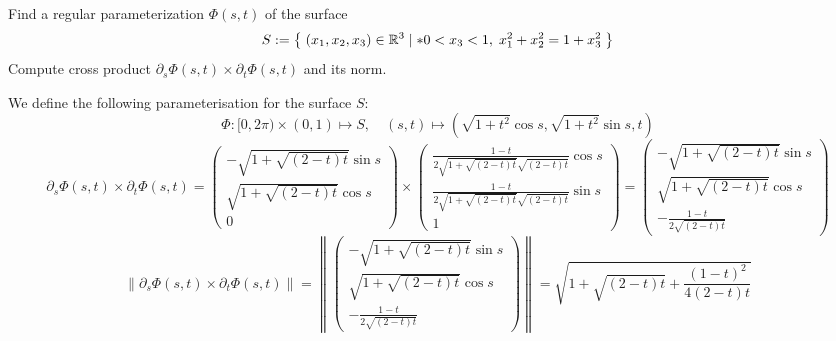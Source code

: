 \documentclass[11pt]{article}
\begin{document}
\begin{exercise}
    Find a regular parameterization $\Phi(s,t)$ of the surface 
    \begin{gather*}
        S := \left\{\; (x_1,x_2,x_3) \in \mathbb R^3 \suchthat* 0 < x_3 < 1, \; x_1^2 + x_2^2 = 1 + x_3^2 \;\right\}
    \end{gather*}
    Compute cross product $\partial_s \Phi(s,t) \times \partial_t \Phi(s,t)$ and its norm. 
\end{exercise}
\begin{solution}     
    We define the following parameterisation for the surface $S$:
    \[
        \Phi: [0,2\pi) \times (0,1) \mapsto S,
        \quad 
        (s,t) \mapsto \left( \sqrt{1+t^{2}}\cos s, \sqrt{1+t^{2}}\sin s, t \right)
    \]
    \[
        \partial_s \Phi(s,t) \times \partial_t \Phi(s,t) 
        = 
        \begin{pmatrix} 
            -\sqrt{1+\sqrt{(2 - t)t}}\sin s
            \\ 
            \sqrt{1+\sqrt{(2 - t)t}}\cos s
            \\
            0 
        \end{pmatrix} 
        \times 
        \begin{pmatrix} 
            \frac{1 - t}{2\sqrt{1+\sqrt{(2-t)t}}\sqrt{(2-t)t}}\cos s 
            \\ 
            \frac{1 - t}{2\sqrt{1+\sqrt{(2-t)t}}\sqrt{(2-t)t}}\sin s 
            \\
            1 
        \end{pmatrix} 
        = 
        \begin{pmatrix} 
            -\sqrt{1+\sqrt{(2 - t)t}}\sin s 
            \\ 
            \sqrt{1+\sqrt{(2 - t)t}}\cos s
            \\ 
            -\frac{1 - t}{2\sqrt{(2-t)t}} 
        \end{pmatrix} 
    \]
    \[
        \left\|
        \partial_s \Phi(s,t) \times \partial_t \Phi(s,t)
        \right\| 
        = 
        \left\| 
        \begin{pmatrix} -\sqrt{1+\sqrt{(2 - t)t}}\sin s \\ \sqrt{1+\sqrt{(2 - t)t}}\cos s\\ -\frac{1 - t}{2\sqrt{(2-t)t}} \end{pmatrix} \right\| 
        = 
        \sqrt{1+\sqrt{(2 - t)t} + \frac{(1 - t)^2}{4(2-t)t}}
    \]
\end{solution}
\end{document}
